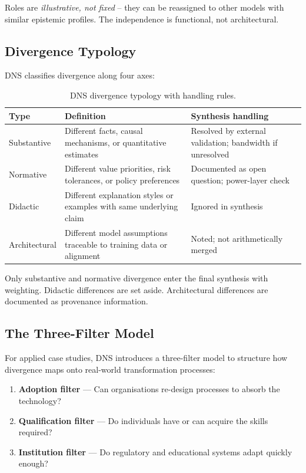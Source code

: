 \documentclass[10pt,a4paper]{article}
\begin{document}
Roles are \textit{illustrative, not fixed} – they can be reassigned to other models
with similar epistemic profiles. The independence is functional, not architectural.

\subsection{Divergence Typology}
\label{sec:typology}

DNS classifies divergence along four axes:

\begin{table}[h]
\centering
\caption{DNS divergence typology with handling rules.}
\label{tab:typology}
\begin{tabularx}{\textwidth}{lXl}
\toprule
\textbf{Type} & \textbf{Definition} & \textbf{Synthesis handling} \\
\midrule
Substantive & Different facts, causal mechanisms, or quantitative estimates & Resolved by external validation; bandwidth if unresolved \\
Normative & Different value priorities, risk tolerances, or policy preferences & Documented as open question; power-layer check \\
Didactic & Different explanation styles or examples with same underlying claim & Ignored in synthesis \\
Architectural & Different model assumptions traceable to training data or alignment & Noted; not arithmetically merged \\
\bottomrule
\end{tabularx}
\end{table}

Only substantive and normative divergence enter the final synthesis with weighting.
Didactic differences are set aside. Architectural differences are documented as
provenance information.

\subsection{The Three-Filter Model}
\label{sec:filters}

For applied case studies, DNS introduces a three-filter model to structure how
divergence maps onto real-world transformation processes:

\begin{enumerate}[leftmargin=*, label=\textbf{Filter \arabic{*}.}]
  \item \textbf{Adoption filter} — Can organisations re-design processes to absorb
        the technology?
  \item \textbf{Qualification filter} — Do individuals have or can acquire the
        skills required?
  \item \textbf{Institution filter} — Do regulatory and educational systems adapt
        quickly enough?
\end{enumerate}
\end{document}
